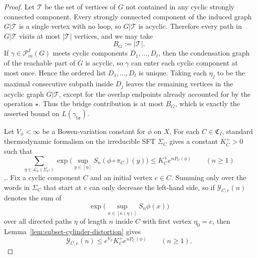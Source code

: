 \documentclass{etds}%
\numberwithin{equation}{section}
\theoremstyle{plain}
\theoremstyle{definition}
\theoremstyle{remark}
\begin{document}
\begin{proof}
Let $\mathcal{T}$ be the set of vertices of $G$ not contained in any cyclic
strongly connected component.  Every strongly connected component of the
induced graph $G|\mathcal{T}$ is a single vertex with no loop, so
$G|\mathcal{T}$ is acyclic.  Therefore every path in $G|\mathcal{T}$ visits at
most $|\mathcal{T}|$ vertices, and we may take
\[
B_G:=|\mathcal{T}|.
\]
If $\gamma\in\mathcal{P}_m^I(G)$ meets cyclic components
$D_1,\dots,D_t$, then the condensation graph of the reachable part of $G$ is
acyclic, so $\gamma$ can enter each cyclic component at most once.  Hence the
ordered list $D_1,\dots,D_t$ is unique.  Taking each $\eta_j$ to be the
maximal consecutive subpath inside $D_j$ leaves the remaining vertices in the
acyclic graph $G|\mathcal{T}$, except for the overlap endpoints already
accounted for by the operation $\star$.  Thus the bridge contribution is at
most $B_G$, which is exactly the asserted bound on
$L(\gamma_{\mathrm{br}})$.

Let $V_\phi<\infty$ be a Bowen-variation constant for $\phi$ on $X$.  For each
$C\in\mathfrak{C}_I$, standard thermodynamic formalism on the irreducible SFT
$\Sigma_C$ gives a constant $K_C^+>0$ such that
\[
\sum_{\eta\in\mathcal{L}_n(\Sigma_C)}
\exp\!\bigl(\sup_{y\in[\eta]}S_n(\phi\circ\pi_C)(y)\bigr)
\le K_C^+e^{nP_C(\phi)}
\qquad(n\ge 1)
\]
\cite[Ch.~1]{Bowen1975},\cite[Ch.~9]{WaltersErgodicTheory}.  Fix a cyclic
component $C$ and an initial vertex $e\in C$.  Summing only over the words in
$\Sigma_C$ that start at $e$ can only decrease the left-hand side, so if
$\mathcal{Y}_{C,e}(n)$ denotes the sum of
\[
\exp\!\bigl(\sup_{x\in[\kappa(\eta)]}S_n\phi(x)\bigr)
\]
over all directed paths $\eta$ of length $n$ inside $C$ with first vertex
$\eta_0=e$, then Lemma~\ref{lem:subset-cylinder-distortion} gives
\[
\mathcal{Y}_{C,e}(n)\le e^{V_\phi}K_C^+e^{nP_C(\phi)}
\qquad(n\ge 1).
\]


\end{proof}
\end{document}

